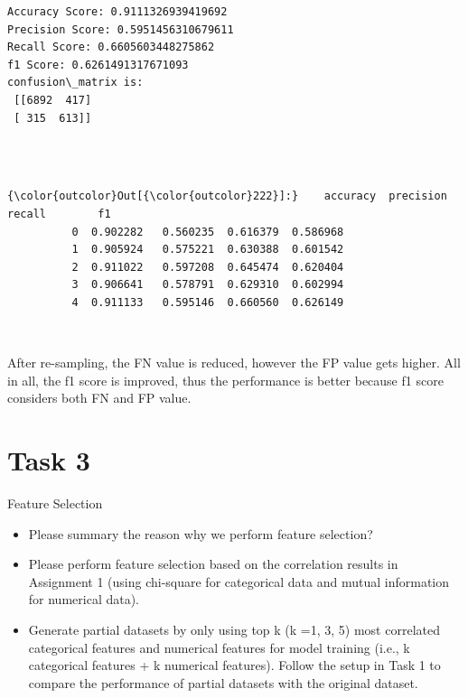 \documentclass[11pt]{article}
\providecommand{\tightlist}{%
      \setlength{\itemsep}{0pt}\setlength{\parskip}{0pt}}
\begin{document}
    \begin{Verbatim}[commandchars=\\\{\}]
Accuracy Score: 0.9111326939419692
Precision Score: 0.5951456310679611
Recall Score: 0.6605603448275862
f1 Score: 0.6261491317671093
confusion\_matrix is: 
 [[6892  417]
 [ 315  613]] 


    \end{Verbatim}

  

    \begin{center}
    \end{center}
    { \hspace*{\fill} \\}
    
\begin{Verbatim}[commandchars=\\\{\}]
{\color{outcolor}Out[{\color{outcolor}222}]:}    accuracy  precision    recall        f1
          0  0.902282   0.560235  0.616379  0.586968
          1  0.905924   0.575221  0.630388  0.601542
          2  0.911022   0.597208  0.645474  0.620404
          3  0.906641   0.578791  0.629310  0.602994
          4  0.911133   0.595146  0.660560  0.626149
\end{Verbatim}
            
    \begin{center}
    \end{center}
    { \hspace*{\fill} \\}
    
    After re-sampling, the FN value is reduced, however the FP value gets
higher. All in all, the f1 score is improved, thus the performance is
better because f1 score considers  both FN and FP value.

    \section*{Task 3}\label{task-3}

Feature Selection

\begin{itemize}
\tightlist
\item
  Please summary the reason why we perform feature selection?
\item
  Please perform feature selection based on the correlation results in
  Assignment 1 (using chi-square for categorical data and mutual
  information for numerical data).
\item
  Generate partial datasets by only using top k (k =1, 3, 5) most
  correlated categorical features and numerical features for model
  training (i.e., k categorical features + k numerical features). Follow
  the setup in Task 1 to compare the performance of partial datasets
  with the original dataset.
\end{itemize}
\end{document}
